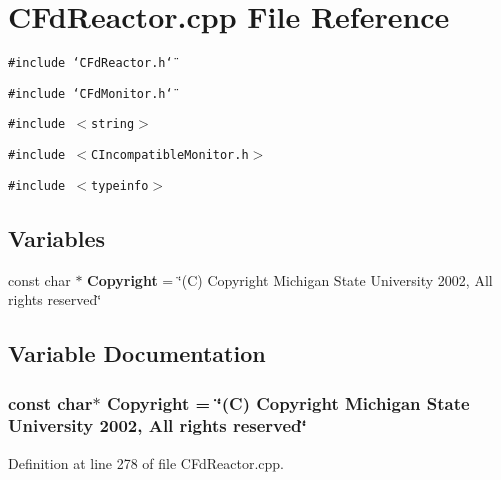 \section{CFd\-Reactor.cpp File Reference}
\label{CFdReactor_8cpp}
{\tt \#include \char`\"{}CFd\-Reactor.h\char`\"{}}\par
{\tt \#include \char`\"{}CFd\-Monitor.h\char`\"{}}\par
{\tt \#include $<$string$>$}\par
{\tt \#include $<$CIncompatible\-Monitor.h$>$}\par
{\tt \#include $<$typeinfo$>$}\par
\subsection*{Variables}
\begin{CompactItemize}
\item 
const char $\ast$ {\bf Copyright} = \char`\"{}(C) Copyright Michigan State University 2002, All rights reserved\char`\"{}
\end{CompactItemize}


\subsection{Variable Documentation}
\subsubsection{\setlength{\rightskip}{0pt plus 5cm}const char$\ast$ Copyright = \char`\"{}(C) Copyright Michigan State University 2002, All rights reserved\char`\"{}\hspace{0.3cm}{\tt  [static]}}\label{CFdReactor_8cpp_a0}




Definition at line 278 of file CFd\-Reactor.cpp.